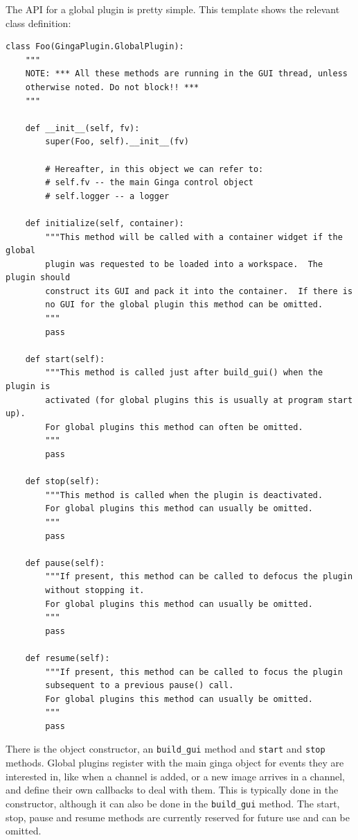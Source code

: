 \documentclass[11pt]{report}
\begin{document}
The API for a global plugin is pretty simple.  This template shows the
relevant class definition:
\begin{lstlisting}
class Foo(GingaPlugin.GlobalPlugin):
    """
    NOTE: *** All these methods are running in the GUI thread, unless
    otherwise noted. Do not block!! ***  
    """

    def __init__(self, fv):
        super(Foo, self).__init__(fv)

        # Hereafter, in this object we can refer to:
        # self.fv -- the main Ginga control object
        # self.logger -- a logger

    def initialize(self, container):
        """This method will be called with a container widget if the global
        plugin was requested to be loaded into a workspace.  The plugin should
        construct its GUI and pack it into the container.  If there is
        no GUI for the global plugin this method can be omitted.
        """
        pass

    def start(self):
        """This method is called just after build_gui() when the plugin is
        activated (for global plugins this is usually at program start up).
        For global plugins this method can often be omitted.
        """
        pass

    def stop(self):
        """This method is called when the plugin is deactivated.
        For global plugins this method can usually be omitted.
        """
        pass

    def pause(self):
        """If present, this method can be called to defocus the plugin
        without stopping it.  
        For global plugins this method can usually be omitted.
        """
        pass

    def resume(self):
        """If present, this method can be called to focus the plugin
        subsequent to a previous pause() call.  
        For global plugins this method can usually be omitted.
        """
        pass
\end{lstlisting}
There is the object constructor, an {\tt build\_gui} method and 
{\tt start} and {\tt stop} methods.  
Global plugins register with the main ginga object for events they
are interested in, like when a channel is added, or a new image arrives
in a channel, and define their own callbacks to deal with them.  This is
typically done in the constructor, although it can also be done in the
{\tt build\_gui} method.  The start, stop, pause and resume methods are
currently reserved for future use and can be omitted. 
\end{document}
